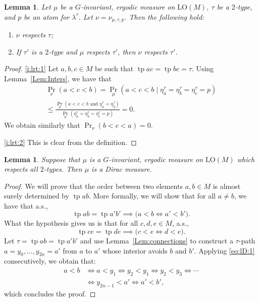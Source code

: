 \documentclass[11pt]{article}
\newcommand{\skpt}{\smallskip}
\providecommand{\And}{}\numberwithin{equation}{section}
\theoremstyle{plain}
\newtheorem{lemma}[theorem]{Lemma}
\theoremstyle{definition}
\DeclareMathOperator{\tp}{tp}
\newcommand{\LO}{\mathrm{LO}}
\renewcommand{\And}{\text{ and }}
\begin{document}
\begin{lemma}
\label{l:respecting-types}
Let $\mu$ be a $G$-invariant, ergodic measure on $\LO(M)$, $\tau$ be a $2$-type, and $p$ be an atom for $\lambda^\tau$. Let $\nu = \nu_{\mu, \tau, p}$. Then the following hold:
\begin{enumerate}
\item \label{i:lrt:1} $\nu$ respects $\tau$;
\item \label{i:lrt:2} If $\tau'$ is a $2$-type and $\mu$ respects $\tau'$, then $\nu$ respects $\tau'$.
\end{enumerate}
\end{lemma}
\skpt
\begin{proof}
\eqref{i:lrt:1} Let $a, b, c \in M$ be such that $\tp ac = \tp bc = \tau$. Using Lemma~\ref{Lem:Inters}, we have that
\begin{equation*}
\begin{split}
\Pr_\nu(a < c < b) = \Pr_\mu(a < c < b \mid \eta^\tau_a = \eta^\tau_b = \eta^\tau_c = p) \\
\leq \frac{\Pr_\mu(a < c < b \And \eta^\tau_a = \eta^\tau_b)}{\Pr_\mu(\eta^\tau_a = \eta^\tau_b = \eta^\tau_c = p)} = 0.
\end{split}
\end{equation*}
We obtain similarly that $\Pr_\nu(b < c < a) = 0$.

\eqref{i:lrt:2} This is clear from the definition.
\end{proof}

\begin{lemma}
\label{l:Dirac}
Suppose that $\mu$ is a $G$-invariant, ergodic measure on $\LO(M)$ which respects all $2$-types. Then $\mu$ is a Dirac measure.
\end{lemma}
\begin{proof}
We will prove that the order between two elements $a, b \in M$ is almost surely determined by $\tp ab$. More formally, we will show that for all $a \neq b$, we have that a.s.,\vspace*{-3pt}
\begin{equation*}
\tp ab = \tp a'b' \implies \big(a < b \iff a' < b' \big).
\end{equation*}
What the hypothesis gives us is that for all $c, d, e \in M$, a.s.,\vspace*{-3pt}
\begin{equation}
\label{eq:lD:1}
\tp ce = \tp de \implies \big(c < e \iff d < e \big).
\end{equation}
Let $\tau = \tp ab = \tp a'b'$ and use Lemma~\ref{Lem:connections} to construct a $\tau$-path $a = y_0, \ldots, y_{2n} = a'$ from $a$ to $a'$ whose interior avoids $b$ and $b'$. Applying \eqref{eq:lD:1} consecutively, we obtain that:\vspace*{-7pt}\enlargethispage{.8\baselineskip}%
\begin{equation*}
\begin{split}
a < b &\iff a < y_1 \iff y_2 < y_1 \iff y_2 < y_3 \iff \cdots \\
&\iff y_{2n-1} < a' \iff a' < b',
\end{split}
\end{equation*}
which concludes the proof.
\end{proof}
\end{document}
